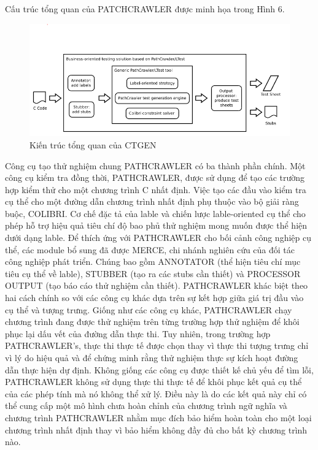 \documentclass[12pt,a4paper]{article}
\begin{document}
\indent Cấu trúc tổng quan của PATCHCRAWLER được minh họa trong Hình 6.
\begin{figure}[ht]
\begin{center}
\includegraphics[scale=.7]{hinhanh/pathcrawler}
\end{center}
\caption{Kiến trúc tổng quan của CTGEN}
\end{figure}
Công cụ tạo thử nghiệm chung PATHCRAWLER có ba thành phần chính. Một công cụ kiểm tra đồng thời, PATHCRAWLER, được sử dụng để tạo các trường hợp kiểm thử cho một chương trình C nhất định. Việc tạo các đầu vào kiểm tra cụ thể cho một đường dẫn chương trình nhất định phụ thuộc vào bộ giải ràng buộc, COLIBRI. Cơ chế đặc tả của lable và chiến lược lable-oriented cụ thể cho phép hỗ trợ hiệu quả tiêu chí độ bao phủ thử nghiệm mong muốn được thể hiện dưới dạng lable. Để thích ứng với PATHCRAWLER cho bối cảnh công nghiệp cụ thể, các module bổ sung đã được MERCE, chi nhánh nghiên cứu của đối tác công nghiệp phát triển. Chúng bao gồm ANNOTATOR (thể hiện tiêu chí mục tiêu cụ thể về lable), STUBBER (tạo ra các stubs cần thiết) và PROCESSOR OUTPUT (tạo báo cáo thử nghiệm cần thiết).\newline
\indent PATHCRAWLER khác biệt theo hai cách chính so với các công cụ khác dựa trên sự kết hợp giữa giá trị đầu vào cụ thể và tượng trưng. Giống như các công cụ khác, PATHCRAWLER chạy chương trình đang được thử nghiệm trên từng trường hợp thử nghiệm để khôi phục lại dấu vết của đường dẫn thực thi. Tuy nhiên, trong trường hợp PATHCRAWLER's, thực thi thực tế được chọn thay vì thực thi tượng trưng chỉ vì lý do hiệu quả và để chứng minh rằng thử nghiệm thực sự kích hoạt đường dẫn thực hiện dự định. Không giống
các công cụ được thiết kế chủ yếu để tìm lỗi, PATHCRAWLER không sử dụng thực thi thực tế để khôi phục kết quả cụ thể của các phép tính mà nó không thể xử lý. Điều này là do các kết quả này chỉ có thể cung cấp một mô hình chưa hoàn chỉnh của chương trình ngữ nghĩa và chương trình PATHCRAWLER nhằm mục đích bảo hiểm hoàn toàn cho một loại chương trình nhất định thay vì bảo hiểm không đầy đủ cho bất kỳ chương trình nào.\newline
\end{document}
